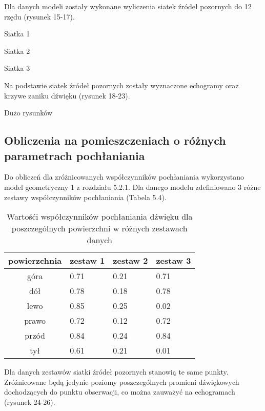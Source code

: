 Dla danych modeli zostały wykonane wyliczenia siatek źródeł pozornych do 12 rzędu (rysunek 15-17).

Siatka 1

Siatka 2

Siatka 3

Na podstawie siatek źródeł pozornych zostały wyznaczone echogramy oraz krzywe zaniku dźwięku (rysunek 18-23).

Dużo rysunków



\subsection{Obliczenia na pomieszczeniach o różnych parametrach pochłaniania}\label{sec:imstest2}

Do obliczeń dla zróżnicowanych współczynników pochłaniania wykorzystano model geometryczny 1 z rozdziału 5.2.1. Dla danego modelu zdefiniowano 3 różne zestawy współczynników pochłaniania (Tabela 5.4).

\begin{table}[h]
        \centering
        \begin{threeparttable}
                \caption{Wartośći współczynników pochłaniania dźwięku dla poszczególnych powierzchni w różnych zestawach danych}\label{tab:table_example}
                \begin{tabularx}{0.6\textwidth}{| c | X | X | X |}
                        \toprule
                        	powierzchnia &	zestaw 1 & zestaw 2 & zestaw 3 \\
                       \midrule
		góra & 0.71 & 0.21 & 0.71 \\
                        dół & 0.78 & 0.18 & 0.78 \\
		lewo & 0.85 & 0.25 & 0.02 \\
                     prawo & 0.72 & 0.12 & 0.72 \\
		przód & 0.84 & 0.24 & 0.84 \\
                    tył & 0.61 & 0.21 & 0.01 \\
                        \bottomrule
                \end{tabularx}
        \end{threeparttable}
\end{table}

Dla danych zestawów siatki źródeł pozornych stanowią te same punkty. Zróżnicowane będą jedynie poziomy poszczególnych promieni dźwiękowych dochodzących do punktu obserwacji, co można zauważyć na echogramach (rysunek 24-26).

